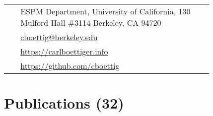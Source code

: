 \documentclass[10pt]{article} %
\begin{document}
\begin{paracol}{2}
\begin{supertabular}{rl}
\end{supertabular}
  

\switchcolumn %


\parbox[top][0.12\textheight][c]{\linewidth}{ %
	\vspace{-0.04\textheight} %
	\colorbox{shade}{ %
		\begin{supertabular}{p{0.05\linewidth}|p{0.775\linewidth}} %
			\raisebox{-1pt}{\faHome} & ESPM Department, University of California, 130 Mulford Hall \#3114 Berkeley, CA 94720 \\ %
			\raisebox{0pt}{\small\faEnvelope} & \href{mailto:cboettig@berkeley.eu}{cboettig@berkeley.edu} \\ %
			\raisebox{-1pt}{\small\faDesktop} & \href{https://carlboettiger.info}{https://carlboettiger.info} \\ %
			\raisebox{-1pt}{\faGithub} & \href{https://github.com/cboettig}{https://github.com/cboettig} \\ %
		\end{supertabular}
	}
}



\section{Publications (32)}




\end{paracol}
\end{document}
